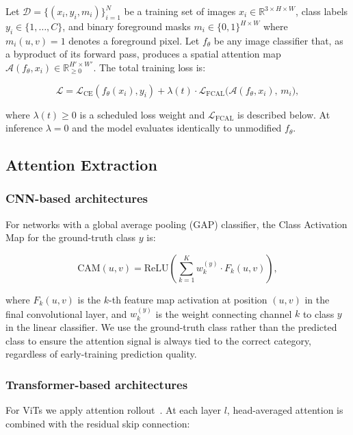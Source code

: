 \documentclass[journal]{IEEEtran}
\begin{document}
Let $\mathcal{D} = \{(x_i, y_i, m_i)\}_{i=1}^{N}$ be a training
set of images $x_i \in \mathbb{R}^{3 \times H \times W}$, class
labels $y_i \in \{1,\ldots,C\}$, and binary foreground masks
$m_i \in \{0,1\}^{H \times W}$ where $m_i(u,v) = 1$ denotes a
foreground pixel. Let $f_\theta$ be any image classifier that, as
a byproduct of its forward pass, produces a spatial attention map
$\mathcal{A}(f_\theta, x_i) \in \mathbb{R}_{\geq 0}^{H' \times W'}$.
The total training loss is:

\begin{equation}
  \mathcal{L}
    = \mathcal{L}_{\mathrm{CE}}(f_\theta(x_i), y_i)
    + \lambda(t) \cdot \mathcal{L}_{\mathrm{FCAL}}
      \!\bigl(\mathcal{A}(f_\theta, x_i),\, m_i\bigr),
  \label{eq:total}
\end{equation}

where $\lambda(t) \geq 0$ is a scheduled loss weight and
$\mathcal{L}_{\mathrm{FCAL}}$ is described below. At inference
$\lambda = 0$ and the model evaluates identically to unmodified
$f_\theta$.

\subsection{Attention Extraction}
\label{subsec:attn}

\subsubsection{CNN-based architectures}
For networks with a global average pooling (GAP) classifier, the
Class Activation Map for the ground-truth class $y$ is:

\begin{equation}
  \mathrm{CAM}(u,v)
    = \mathrm{ReLU}\!\left(\sum_{k=1}^{K}
        w_k^{(y)} \cdot F_k(u,v)\right),
  \label{eq:cam}
\end{equation}

where $F_k(u,v)$ is the $k$-th feature map activation at position
$(u,v)$ in the final convolutional layer, and $w_k^{(y)}$ is the
weight connecting channel $k$ to class $y$ in the linear
classifier. We use the ground-truth class rather than the predicted
class to ensure the attention signal is always tied to the correct
category, regardless of early-training prediction quality.

\subsubsection{Transformer-based architectures}
For ViTs we apply attention rollout~\cite{abnar2020quantifying}.
At each layer $l$, head-averaged attention is combined with the
residual skip connection:
\end{document}
